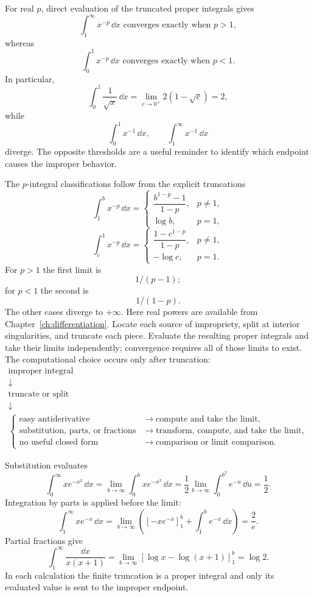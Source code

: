 \begin{example}
For real $p$, direct evaluation of the truncated proper integrals gives
\[
\int_1^\infty x^{-p}\,\dd x
\text{ converges exactly when }p>1,
\]
whereas
\[
\int_0^1 x^{-p}\,\dd x
\text{ converges exactly when }p<1.
\]
In particular,
\[
\int_0^1\frac{1}{\sqrt{x}}\,\dd x
=\lim_{c\to0^+}2(1-\sqrt c)=2,
\]
while
\[
\int_0^1x^{-1}\,\dd x,\qquad \int_1^\infty x^{-1}\,\dd x
\]
 diverge.
The opposite thresholds are a useful reminder to identify which endpoint
causes the improper behavior.
\end{example}

The $p$-integral classifications follow from the explicit truncations
\[
\int_1^b x^{-p}\,\dd x=
\begin{cases}\dfrac{b^{1-p}-1}{1-p},&p\ne1,\\\log b,&p=1,\end{cases}
\]
\[
\int_c^1 x^{-p}\,\dd x=
\begin{cases}\dfrac{1-c^{1-p}}{1-p},&p\ne1,\\-\log c,&p=1.\end{cases}
\]
For $p>1$ the first limit is
\[
1/(p-1);
\]
 for $p<1$ the second
is
\[
1/(1-p).
\]
 The other cases diverge to $+\infty$.
Here real powers are available from Chapter~\ref{ch:differentiation}.
Locate each source of impropriety, split at interior singularities, and
truncate each piece. Evaluate the resulting proper integrals and take their
limits independently; convergence requires all of those limits to exist.
The computational choice occurs only after truncation:
\[
\begin{array}{c}
\text{improper integral}\\
\downarrow\\
\text{truncate or split}\\
\downarrow\\[-1mm]
\begin{cases}
\text{easy antiderivative}&\longrightarrow\text{compute and take the limit},\\
\text{substitution, parts, or fractions}
&\longrightarrow\text{transform, compute, and take the limit},\\
\text{no useful closed form}&\longrightarrow\text{comparison or limit comparison}.
\end{cases}
\end{array}
\]

\begin{example}
Substitution evaluates
\[
\int_0^\infty xe^{-x^2}\,\dd x
=\lim_{b\to\infty}\int_0^b xe^{-x^2}\,\dd x
=\frac12\lim_{b\to\infty}\int_0^{b^2}e^{-u}\,\dd u
=\frac12.
\]
Integration by parts is applied before the limit:
\[
\int_1^\infty xe^{-x}\,\dd x
=\lim_{b\to\infty}\left([-xe^{-x}]_1^b+
\int_1^b e^{-x}\,\dd x\right)=\frac2e.
\]
Partial fractions give
\[
\int_1^\infty\frac{\dd x}{x(x+1)}
=\lim_{b\to\infty}
\left[\log x-\log(x+1)\right]_1^b
=\log2.
\]
In each calculation the finite truncation is a proper integral and only its
evaluated value is sent to the improper endpoint.
\end{example}

